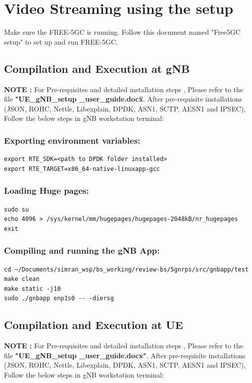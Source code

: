 \section{Video Streaming using the setup} 
Make sure the FREE-5GC is running. Follow this document named "Free5GC setup" to set up and run FREE-5GC.
\subsection{Compilation and Execution at gNB}
\textbf{NOTE :} For Pre-requisites and detailed installation steps , Please refer to the file \textbf{"UE\_gNB\_setup \_user\_guide.docx\"}.
After pre-requisite installations (JSON, ROHC, Nettle, Libexplain, DPDK, ASN1, SCTP, AESN1 and IPSEC), Follow the below steps in gNB workstation terminal:

\subsubsection{Exporting environment variables:}

\begin{lstlisting}
export RTE_SDK=<path to DPDK folder installed>
export RTE_TARGET=x86_64-native-linuxapp-gcc
\end{lstlisting}

\subsubsection{Loading Huge pages:}
\begin{lstlisting}
sudo su
echo 4096 > /sys/kernel/mm/hugepages/hugepages-2048kB/nr_hugepages
exit
\end{lstlisting}

\subsubsection{Compiling and running the gNB App:}
\begin{lstlisting}
cd ~/Documents/simran_wsp/bs_working/review-bs/5gnrps/src/gnbapp/test
make clean
make static -j10
sudo ./gnbapp enp1s0 -- -diersg
\end{lstlisting}

\subsection{Compilation and Execution at UE}
\textbf{NOTE :} For Pre-requisites and detailed installation steps , Please refer to the file \textbf{"UE\_gNB\_setup \_user\_guide.docx"}.
After pre-requisite installations (JSON, ROHC, Nettle, Libexplain, DPDK, ASN1, SCTP, AESN1 and IPSEC), Follow the below steps in gNB workstation terminal:

